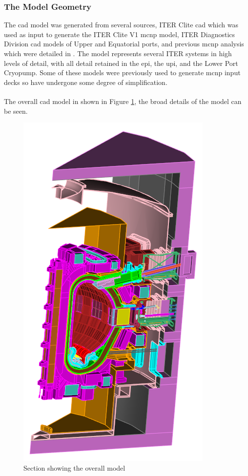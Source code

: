 \documentclass[12pt]{article}
\begin{document}
\subsubsection{The Model Geometry}
The \gls{cad} model was generated from several sources, ITER Clite \gls{cad}
which was used as input to generate the ITER Clite V1 \gls{mcnp} model, ITER
Diagnostics Division \gls{cad} models of Upper and Equatorial ports, and
previous \gls{mcnp} analysis which were detailed in \cite{cad_origination}. The
model represents several ITER systems in high levels of detail, with all detail
retained in the \gls{epi}, the  \gls{upi}, and the Lower Port Cryopump. Some of
these models were previously used to generate \gls{mcnp} input decks so have
undergone some degree of simplification.
\\
\\
The overall \gls{cad} model in shown in Figure \ref{fig:cad_iter_global}, the
broad details of the model can be seen. 
\begin{figure}[ht!]
  \centering
  \includegraphics[scale=0.8]{../plots/cad/global.png}
  \caption{Section showing the overall model}
  \label{fig:cad_iter_global}
\end{figure}
\end{document}
